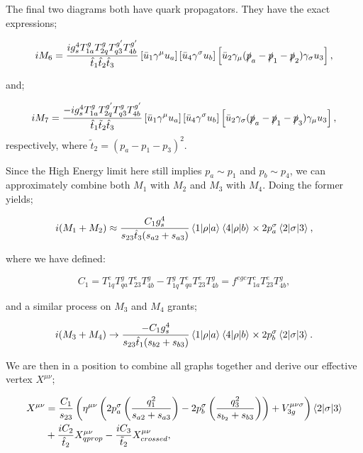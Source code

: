 The final two diagrams both have quark propagators. They have the exact expressions;

\begin{equation}
iM_6 = \frac{i g_s^4 T^g_{1a} T^{g}_{2q} T^{g'}_{q3}  T^{g'}_{4b}}{\hat{t}_1 \hat{t}_2 \hat{t}_3}\left[\bar{u}_1 \gamma^\mu u_a \right] \left[\bar{u}_4 \gamma^\sigma u_b \right] \left[\bar{u}_2 \gamma_\mu(\slashed{p}_a - \slashed{p}_1 -\slashed{p}_2) \gamma_\sigma u_3 \right],
\end{equation}

and;

\begin{equation}
iM_7 = \frac{-i g_s^4 T^g_{1a} T^{g'}_{2q} T^{g}_{q3}  T^{g'}_{4b}}{\hat{t}_1 \tilde{t}_2 \hat{t}_3}\left[\bar{u}_1 \gamma^\mu u_a \right] \left[\bar{u}_4 \gamma^\sigma u_b \right] \left[\bar{u}_2 \gamma_\sigma(\slashed{p}_a - \slashed{p}_1 -\slashed{p}_3) \gamma_\mu u_3 \right],
\end{equation}
respectively, where $\tilde{t}_2 = (p_a-p_1-p_3)^2$. 

Since the High Energy limit here still implies $p_a \sim p_1$ and $p_b \sim p_4$, we can approximately combine both $M_1$ with $M_2$ and $M_3$ with $M_4$. Doing the former yields;

\begin{equation}
i(M_1 + M_2) \approx \frac{ C_1 g_s^4}{s_{23} \hat{t}_3 (s_{a2} + s_{a3})} \mathinner{\langle1\vert\rho\vert a\rangle}_{} \mathinner{\langle4\vert\rho\vert b\rangle}_{} \times 2 p_a^\sigma \mathinner{\langle2\vert\sigma\vert3\rangle}_{},
\end{equation} 

where we have defined:

\begin{equation}
C_1 = T^e_{1q}T^g_{qa} T^e_{23}T^g_{4b} - T^g_{1q}T^e_{qa}T^e_{23}T^g_{4b} = f^{egc}T^c_{1a}T^e_{23}T^g_{4b},
\end{equation}

and a similar process on $M_3$ and $M_4$ grants;

\begin{equation}
i(M_3 + M_4) \to \frac{-C_1 g_s^4}{s_{23}\hat{t}_1 (s_{b2}+s_{b3})} \mathinner{\langle1\vert\rho\vert a\rangle}_{} \mathinner{\langle4\vert\rho\vert b\rangle}_{} \times 2 p_b^\sigma \mathinner{\langle2\vert\sigma\vert3\rangle}_{}. 
\end{equation}

We are then in a position to combine all graphs together and derive our effective vertex $X^{\mu \nu}$;

\begin{equation}
\begin{split}
X^{\mu \nu} &=  \frac{C_1}{s_{23}}\left(\eta^{\mu \nu}\left(2 p_a^\sigma \left( \frac{q_1^2}{s_{a2}+s_{a3}} \right) - 2 p_b^\sigma \left(\frac{q_3^2}{s_{b_2}+s_{b3}} \right) \right)+ V_{3g}^{\mu \nu \sigma} \right)\mathinner{\langle2\vert\sigma\vert3\rangle}_{} \\
&+ \frac{i C_2}{\hat{t}_2} X_{qprop}^{\mu \nu} - \frac{i C_3}{\tilde{t}_2} X_{crossed}^{\mu \nu},
\end{split}
\end{equation}

